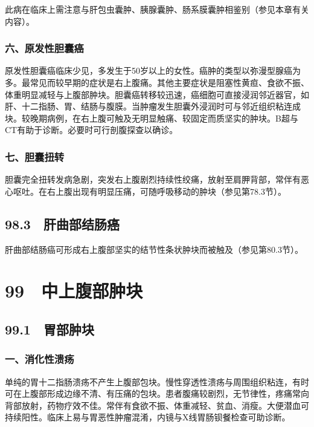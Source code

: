 此病在临床上需注意与肝包虫囊肿、胰腺囊肿、肠系膜囊肿相鉴别（参见本章有关内容）。

\subsubsection{六、原发性胆囊癌}

原发性胆囊癌临床少见，多发生于50岁以上的女性。癌肿的类型以弥漫型腺癌为多。最常见而较早期的症状是右上腹痛。其他主要症状是阻塞性黄疸、食欲不振、体重明显减轻与上腹部肿块。胆囊癌转移较迅速，癌细胞可直接浸润邻近器官，如肝、十二指肠、胃、结肠与腹膜。当肿瘤发生胆囊外浸润时可与邻近组织粘连成块。较晚期病例，在右上腹可触及无明显触痛、较固定而质坚实的肿块。B超与CT有助于诊断。必要时可行剖腹探查以确诊。

\subsubsection{七、胆囊扭转}

胆囊完全扭转发病急剧，突发右上腹剧烈持续性绞痛，放射至肩胛背部，常伴有恶心呕吐。在右上腹出现有明显压痛，可随呼吸移动的肿块（参见第78.3节）。

\subsection{98.3　肝曲部结肠癌}

肝曲部结肠癌可形成右上腹部坚实的结节性条状肿块而被触及（参见第80.3节）。

\protect\hypertarget{text00230.html}{}{}

\section{99　中上腹部肿块}

\subsection{99.1　胃部肿块}

\subsubsection{一、消化性溃疡}

单纯的胃十二指肠溃疡不产生上腹部包块。慢性穿透性溃疡与周围组织粘连，有时可在上腹部形成边缘不清、有压痛的包块。患者腹痛较剧烈，无节律性，疼痛常向背部放射，药物疗效不佳。常伴有食欲不振、体重减轻、贫血、消瘦。大便潜血可持续阳性。临床上易与胃恶性肿瘤混淆，内镜与X线胃肠钡餐检查可助诊断。

